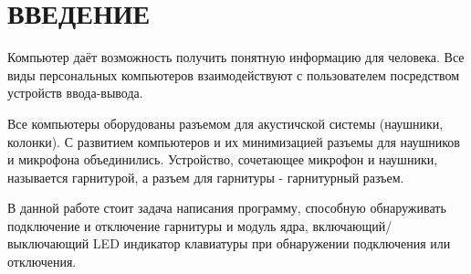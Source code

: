 \section*{ВВЕДЕНИЕ}

Компьютер даёт возможность получить понятную информацию для человека. Все виды персональных компьютеров взаимодействуют с пользователем посредством устройств ввода-вывода. 

Все компьютеры оборудованы разъемом для акустичской системы (наушники, колонки). С развитием компьютеров и их минимизацией разъемы для наушников и микрофона объединились. Устройство, сочетающее микрофон и наушники, называется гарнитурой, а разъем для гарнитуры - гарнитурный разъем.

В данной работе стоит задача написания программу, способную обнаруживать подключение и отключение гарнитуры и модуль ядра, включающий/выключающий LED индикатор клавиатуры при обнаружении подключения или отключения.